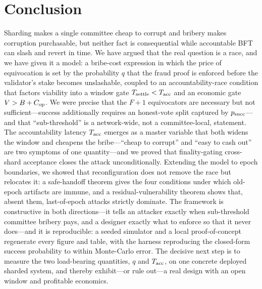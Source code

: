 \section{Conclusion}
\label{sec:conclusion}

Sharding makes a single committee cheap to corrupt and bribery makes corruption purchasable, but
neither fact is consequential while accountable BFT can slash and revert in time. We have argued that
the real question is a race, and we have given it a model: a bribe-cost expression in which the price
of equivocation is set by the probability $q$ that the fraud proof is enforced before the validator's
stake becomes unslashable, coupled to an accountability-race condition that factors viability into a
window gate $T_{\mathrm{settle}}<T_{\mathrm{acc}}$ and an economic gate $V>B+C_{\mathrm{op}}$. We were precise that the $F{+}1$
equivocators are necessary but not sufficient---success additionally requires an honest-vote split
captured by $p_{\mathrm{succ}}$---and that ``sub-threshold'' is a network-wide, not a committee-local, statement.
The accountability latency $T_{\mathrm{acc}}$ emerges as a master variable that both widens the window and
cheapens the bribe---``cheap to corrupt'' and ``easy to cash out'' are two symptoms of one
quantity---and we proved that finality-gating cross-shard acceptance closes the attack
unconditionally. Extending the model to epoch boundaries, we showed that reconfiguration does not
remove the race but relocates it: a safe-handoff theorem gives the four conditions under which old-epoch
artifacts are immune, and a residual-vulnerability theorem shows that, absent them, last-of-epoch
attacks strictly dominate. The framework is constructive in both directions---it tells an attacker
exactly when sub-threshold committee bribery pays, and a designer exactly what to enforce so that it
never does---and it is reproducible: a seeded simulator and a local proof-of-concept regenerate every
figure and table, with the harness reproducing the closed-form success probability to within
Monte-Carlo error. The decisive next step is to measure the two load-bearing quantities, $q$ and
$T_{\mathrm{acc}}$, on one concrete deployed sharded system, and thereby exhibit---or rule out---a real design
with an open window and profitable economics.
